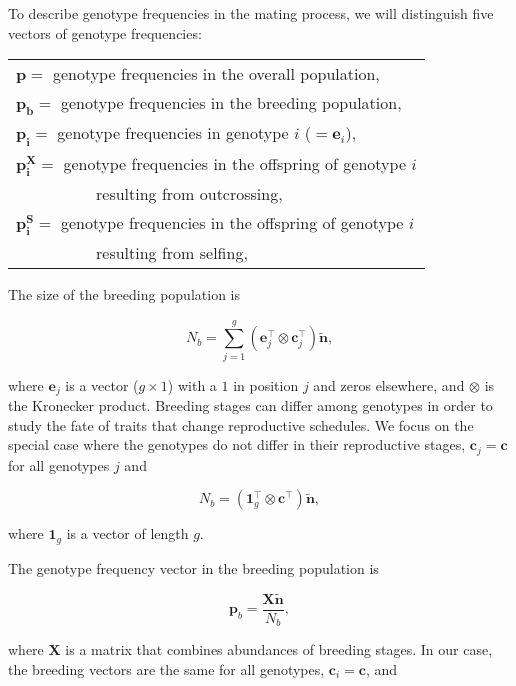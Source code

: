 \documentclass[11pt]{article}
\def\mbf#1{\mathbf{#1}}
\begin{document}
To describe genotype frequencies in the mating process, we will distinguish five vectors of genotype frequencies:

\begin{table}[htbp]
\centering
\begin{tabular}{ l } 
	$\mbf{p} =$ genotype frequencies in the overall population, \\
	$\mbf{p_b} =$ genotype frequencies in the breeding population, \\
	$\mbf{p_i} =$ genotype frequencies in genotype $i$ ($=\mbf{e}_i$), \\
	$\mbf{p^X_i} =$ genotype frequencies in the offspring of genotype $i$ \\
	~~~~~~~~~~resulting from outcrossing, \\
	$\mbf{p^S_i} =$ genotype frequencies in the offspring of genotype $i$ \\
	~~~~~~~~~~resulting from selfing,\\
\end{tabular}
\end{table}


The size of the breeding population is

\begin{equation}
	N_b = \sum_{j=1}^g (\mbf{e}_j^\intercal \otimes \mbf{c}_j^\intercal) \tilde{\mbf{n}},
\end{equation}

\noindent where $\mbf{e}_j$ is a vector ($g \times 1$) with a $1$ in position $j$ and zeros elsewhere, and $\otimes$ is the Kronecker product. Breeding stages can differ among genotypes in order to study the fate of traits that change reproductive schedules. We focus on the special case where the genotypes do not differ in their reproductive stages, $\mbf{c}_j = \mbf{c}$ for all genotypes $j$ and

\begin{equation}
	N_b = (\mbf{1}_g^\intercal \otimes \mbf{c}^\intercal) \tilde{\mbf{n}},
\end{equation}

\noindent where $\mbf{1}_g$ is a vector of length $g$.

The genotype frequency vector in the breeding population is 

\begin{equation}
	\mbf{p}_b = \frac{\mbf{X} \tilde{\mbf{n}}}{N_b},
\end{equation}

\noindent where $\mbf{X}$ is a matrix that combines abundances of breeding stages. In our case, the breeding vectors are the same for all genotypes, $\mbf{c}_i = \mbf{c}$, and 
\end{document}
